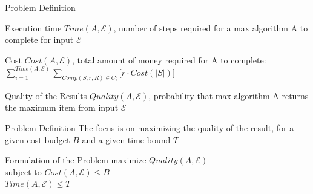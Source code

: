 \documentclass{beamer}
\begin{document}
\begin{frame}{Problem Definition}
		\begin{block}{Execution time}
			$Time(A,\mathcal{E})$, number of steps required for a max algorithm A to complete for input $\mathcal{E}$
		\end{block}
		\pause
		\begin{block}{Cost}%
			$Cost(A,\mathcal{E})$, total amount of money required for A to complete:\\\vspace{5pt}$\sum_{i=1}^{Time(A,\mathcal{E})}\sum_{Comp(S, r, R)\in C_{i}} \big[ r \cdot Cost(\left\vert{S}\right\vert )\big]$
		\end{block}
		\pause
		\begin{block}{Quality of the Results}
			$Quality(A,\mathcal{E})$, probability that max algorithm A returns  the maximum item from input $\mathcal{E}$
		\end{block}

\end{frame}

\begin{frame}{Problem Definition}
	The focus is on maximizing the quality of the result, for a given cost budget $B$ and a given time bound $T$
	\\ \vspace{20pt}
	
	\begin{block}{Formulation of the Problem}
	\hspace{75pt}
	maximize  \hspace{10pt}
	$Quality(A,\mathcal{E})$
	\\
	\vspace{10pt} \hspace{72pt} 
	subject to \hspace{10pt}
	$Cost(A,\mathcal{E}) \le B$		
	\\
	\hspace{134pt}
	\vspace{3pt}
	$Time(A,\mathcal{E}) \le T$ 	
	\end{block}	
\end{frame}

\end{document}
